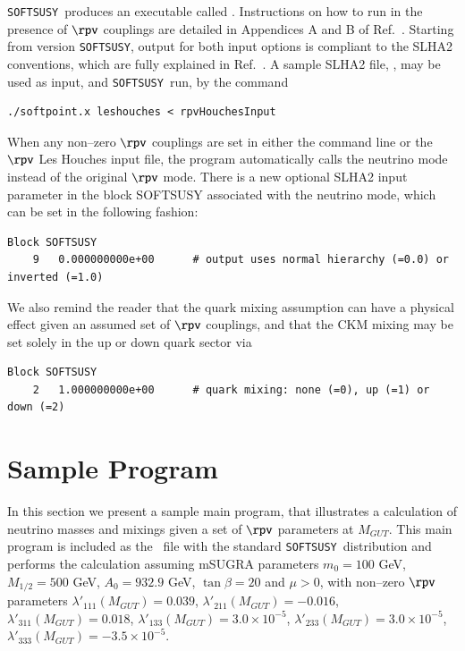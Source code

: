 \documentclass[pdflatex,final,3p,times]{elsarticle}
\def\SOFTSUSY{{\tt SOFTSUSY}}
\begin{document}
\SOFTSUSY~produces an executable called .  
Instructions on how to run
 in the presence of $\rpv$ couplings are detailed in
Appendices A and B of Ref.~\cite{Allanach:2009bv}.  
Starting from version
\SOFTSUSY{}, output for both input options is compliant to the SLHA2
conventions, which are fully explained in Ref.~\cite{Allanach:2008qq}.
A sample SLHA2 file, , may be used as input, and
\SOFTSUSY~run,  by the command 
\begin{verbatim}
./softpoint.x leshouches < rpvHouchesInput
\end{verbatim}
When any non--zero $\rpv$ couplings are set in either the command line 
or the $\rpv$ Les Houches input file, the program
automatically calls the neutrino mode instead of the original $\rpv$
mode. There is a new optional SLHA2 input parameter in the block SOFTSUSY
associated 
with the neutrino mode, which can be set in the following fashion: 
\begin{verbatim}
Block SOFTSUSY
    9   0.000000000e+00      # output uses normal hierarchy (=0.0) or inverted (=1.0)
\end{verbatim}
We also remind the reader that the quark mixing assumption can have a physical
effect given an assumed set of $\rpv$ couplings, and that the CKM mixing may be
set solely in the up or down quark sector via
\begin{verbatim}
Block SOFTSUSY
    2   1.000000000e+00      # quark mixing: none (=0), up (=1) or down (=2)
\end{verbatim}

\section{Sample Program \label{sec:prog}}

In this section we present a sample main program, that illustrates a
calculation of neutrino masses and mixings given a set of $\rpv$
parameters at $M_{GUT}$.  This main program is included as the
~file with the standard \SOFTSUSY~distribution
and performs the calculation assuming mSUGRA parameters $m_0=100$ GeV,
$M_{1/2}=500$ GeV, $A_0=932.9$ GeV, $\tan \beta=20$ and $\mu>0$, with
non--zero $\rpv$ parameters $\lambda'_{111}(M_{GUT})=0.039$,
$\lambda'_{211}(M_{GUT})=-0.016$, $\lambda'_{311}(M_{GUT})=0.018$,
$\lambda'_{133}(M_{GUT})=3.0\times10^{-5}$,
$\lambda'_{233}(M_{GUT})=3.0\times 10^{-5}$,
$\lambda'_{333}(M_{GUT})=-3.5\times10^{-5}$.  
\end{document}
